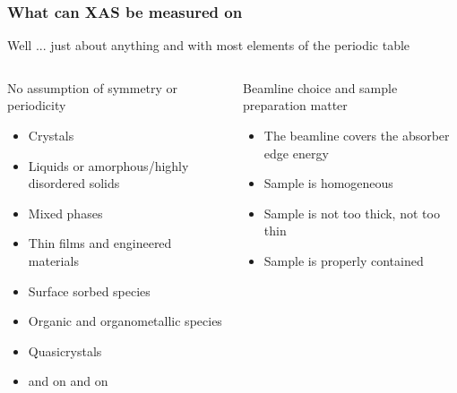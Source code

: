 \documentclass[10pt, xcolor=x11names, compress]{beamer}
\begin{document}
\begin{frame}
  \frametitle{What can XAS be measured on}
  Well ... just about anything and with most elements of the periodic
  table

  \begin{columns}[T]
    \begin{column}{0.5\linewidth}
      \begin{exampleblock}{No assumption of symmetry or periodicity}
        \begin{itemize}
        \item Crystals
        \item Liquids or amorphous/highly disordered solids
        \item Mixed phases
        \item Thin films and engineered materials
        \item Surface sorbed species
        \item Organic and organometallic species
        \item Quasicrystals
        \item and on and on
        \end{itemize}
      \end{exampleblock}
    \end{column}
    \begin{column}{0.5\linewidth}
      \begin{alertblock}{Beamline choice and
          sample preparation matter}
        \begin{itemize}
        \item The beamline covers the absorber edge energy
        \item Sample is homogeneous
        \item Sample is not too thick, not too thin
        \item Sample is properly contained
        \end{itemize}
      \end{alertblock}
    \end{column}
  \end{columns}

\end{frame}
\end{document}

